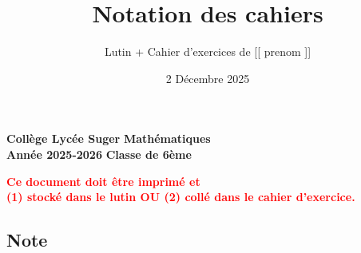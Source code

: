 \documentclass[answers]{exam}
\title{Notation des cahiers}
\author{Lutin + Cahier d'exercices de [[ prenom ]]}
\date{2 Décembre 2025}
\begin{document}
\textbf{Collège Lycée Suger}
\hfill
\textbf{Mathématiques} \\

\textbf{Année 2025-2026}
\hfill
\textbf{Classe de 6ème} \par

{\let\newpage\relax\maketitle}

\begin{tcolorbox}[
  colframe=red!90!black,
  fonttitle=\bfseries,
  boxsep=4pt,
  sharp corners,
]
\begin{center}
\textbf{\textcolor{red}{Ce document doit être imprimé et \\ (1) stocké dans le lutin OU (2) collé dans le cahier d'exercice.}}
\end{center}
\end{tcolorbox}

\subsection*{Note}
\end{document}
